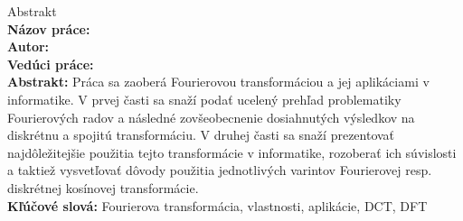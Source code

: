 \pagebreak
\noindent
{\large Abstrakt}
\medskip
\medskip
\\
{\bf Názov práce:} \mytitle \\
{\bf Autor:} \myname \\
{\bf Vedúci práce:} \myleader \\
{\bf Abstrakt:} 
Práca sa zaoberá Fourierovou transformáciou a jej aplikáciami v
informatike. V prvej časti sa snaží podať ucelený
prehľad problematiky Fourierových radov a následné zovšeobecnenie
dosiahnutých výsledkov na diskrétnu a spojitú transformáciu. V druhej
časti sa snaží prezentovať najdôležitejšie použitia tejto
transformácie v informatike, rozoberať ich súvislosti a taktiež
vysvetľovať dôvody použitia jednotlivých varintov Fourierovej resp.
diskrétnej kosínovej transformácie. \\
{\bf Kľúčové slová:} Fourierova transformácia, vlastnosti, aplikácie, DCT, DFT
